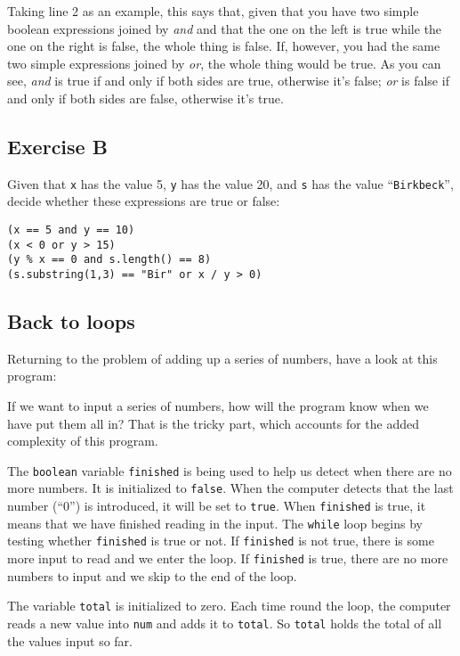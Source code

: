 Taking line 2 as an example, this says that, given that you have two simple
boolean expressions joined by \emph{and} and that the one on the left is
true while the one on the right is false, the whole thing is false.  If,
however, you had the same two simple expressions joined by \emph{or}, the
whole thing would be true. As you can see, \emph{and} is true if and
only if both sides are true, otherwise it's false; \emph{or} is false
if and only if both sides are false, otherwise it's true.

\subsection*{Exercise B}

Given that \texttt{x} has the value 5, \texttt{y} has the value 20,
and \texttt{s} has the value ``\texttt{Birkbeck}'', decide whether these
expressions are true or false:

\begin{Verbatim}
(x == 5 and y == 10)
(x < 0 or y > 15)
(y % x == 0 and s.length() == 8)
(s.substring(1,3) == "Bir" or x / y > 0)
\end{Verbatim}

\subsection{Back to loops}

Returning to the problem of adding up a series of numbers, have a
look at this program:


If we want to input a series of numbers, how will the program know
when we have put them all in?  That is the tricky part, which accounts
for the added complexity of this program.

The \texttt{boolean} variable
\texttt{finished} is being used to help us detect when there are no more
numbers. It is initialized to \texttt{false}.  When the computer detects
that the last number (``0'') is introduced, it will be set to \texttt{true}.
When \texttt{finished} is true, it means that we have finished reading in
the input. The \texttt{while} loop begins by testing whether \texttt{finished}
is true or not.  If \texttt{finished} is not true, there is some more input
to read and we enter the loop. If \texttt{finished} is true, there are
no more numbers to input and we skip to the end of the loop.

The variable \texttt{total} is initialized to zero.
Each time round the loop, the computer reads a new value into \texttt{num}
and adds it to \texttt{total}. So \texttt{total} holds the total of all
the values input so far.

